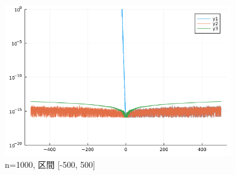 \documentclass[uplatex, dvipdfmx, a4j,11pt]{jsarticle}
\begin{document}
\begin{figure}[h]
  \begin{center}
    \includegraphics[width=100mm]{exp1000_500.png}
    \caption{n=1000, 区間 [-500, 500]}
  \end{center}
\end{figure}
\end{document}
